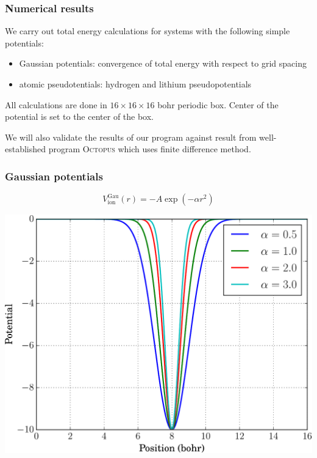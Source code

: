 \documentclass[10pt,t]{beamer}
\begin{document}
\begin{frame}[c]
\frametitle{Numerical results}

We carry out total energy calculations for systems with the following
simple potentials:
\begin{itemize}
\item Gaussian potentials: convergence of total energy with respect to
grid spacing
\item atomic pseudotentials: hydrogen and lithium pseudopotentials
\end{itemize}

All calculations are done in $16\times16\times16$ bohr periodic box.
Center of the potential is set to the center of the box.

We will also validate the results of our program against result from
well-established program \textsc{Octopus} which uses finite difference method.

\end{frame}



\begin{frame}
\frametitle{Gaussian potentials}

\begin{equation*}
V^{\mathrm{Gau}}_{\mathrm{ion}}(r) = -A\exp(-\alpha r^2)
\end{equation*}

{
\centering
\includegraphics[scale=0.5]{images/V_gauss.pdf}
\par
}

\end{frame}
\end{document}
